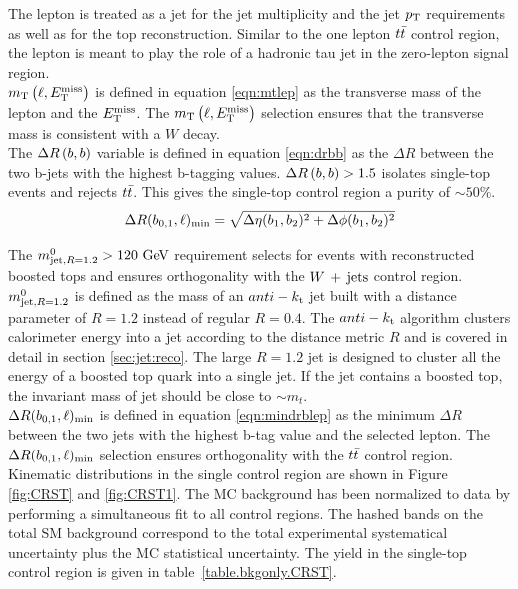 \indent The lepton is treated as a jet for the jet multiplicity and the jet $p_{\mathrm{T}}$ requirements as well as for the top reconstruction.  Similar to the one lepton $t\bar{t}$ control region, the lepton is meant to play the role of a hadronic tau jet in the zero-lepton signal region. \\

\indent $m_{\mathrm{T}}\left(\ell,E_{\mathrm{T}}^{\mathrm{miss}}\right)$ is defined in equation \ref{eqn:mtlep} as the transverse mass of the lepton and the $E_{\mathrm{T}}^{\mathrm{miss}}$.  The $m_{\mathrm{T}}\left(\ell,E_{\mathrm{T}}^{\mathrm{miss}}\right)$ selection ensures that the transverse mass is consistent with a $W$ decay.  \\

\indent The $\Delta R\left(b,b\right)$ variable is defined in equation \ref{eqn:drbb} as the $\Delta R$ between the two b-jets with the highest b-tagging values.  $\Delta R\left(b,b\right) > 1.5$ isolates single-top events and rejects $t\bar{t}$.  This gives the single-top control region a purity of $\sim50\%$. \\

\begin{equation}
\mindrblep = \sqrt{ \Delta\eta(b_1, b_2)^2 + \Delta\phi(b_1, b_2)^2}
\label{eqn:drbb}
\end{equation}

\indent The $\mantikttwelvezero > 120 \gev$ requirement selects for events with reconstructed boosted tops and ensures orthogonality with the $W\,+\,\mathrm{jets}$ control region.  $m^{0}_{\mathrm{jet,}R=1.2}$ is defined as the mass of an $anti-k_{\rm{t}}$ jet built with a distance parameter of $R=1.2$ instead of regular $R=0.4$.  The $anti-k_{\rm{t}}$ algorithm clusters calorimeter energy into a jet according to the distance metric $R$ and is covered in detail in section \ref{sec:jet:reco}.  The large $R=1.2$ jet is designed to cluster all the energy of a boosted top quark into a single jet.  If the jet contains a boosted top, the invariant mass of jet should be close to $\sim m_t$.  \\

\indent $\Delta R(b_{0,1},\ell)_{\mathrm{min}}$ is defined in equation \ref{eqn:mindrblep} as the minimum $\Delta R$ between the two jets with the highest b-tag value and the selected lepton.  The $\Delta R(b_{0,1},\ell)_{\mathrm{min}}$ selection ensures orthogonality with the $t\bar{t}$ control region.  \\

\indent Kinematic distributions in the single control region are shown in Figure \ref{fig:CRST} and \ref{fig:CRST1}.  The MC background has been normalized to data by performing a simultaneous fit to all control regions.  The hashed bands on the total SM background correspond to the total experimental systematical uncertainty plus the MC statistical uncertainty.  The yield in the single-top control region is given in table~\ref{table.bkgonly.CRST}.  \\

